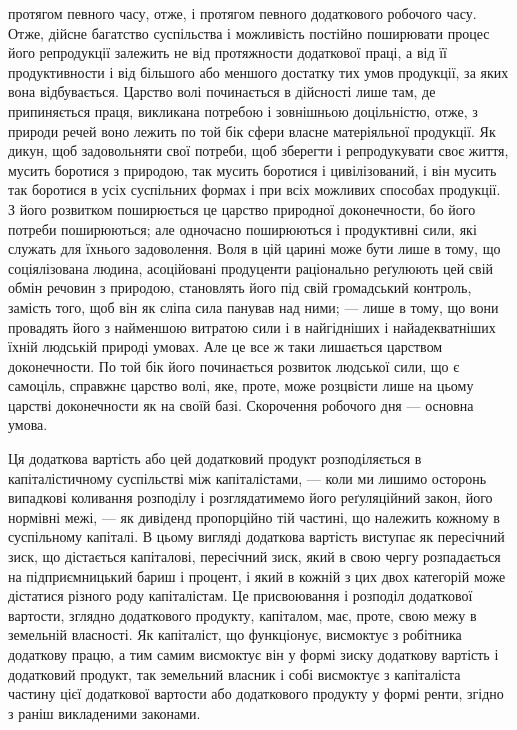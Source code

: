 \parcont{}  %
протягом певного часу, отже, і протягом певного додаткового робочого часу. Отже,
дійсне багатство суспільства і можливість постійно поширювати процес його
репродукції залежить не від протяжности додаткової праці, а від її продуктивности
і від більшого або меншого достатку тих умов продукції, за яких вона відбувається.
Царство волі починається в дійсності лише там, де припиняється праця,
викликана потребою і зовнішньою доцільністю, отже, з природи речей воно
лежить по той бік сфери власне матеріяльної продукції. Як дикун, щоб задовольняти
свої потреби, щоб зберегти і репродукувати своє життя, мусить боротися
з природою, так мусить боротися і цивілізований, і він мусить так боротися
в усіх суспільних формах і при всіх можливих способах продукції. З його
розвитком поширюється це царство природної доконечности, бо його потреби
поширюються; але одночасно поширюються і продуктивні сили, які служать
для їхнього задоволення. Воля в цій царині може бути лише в тому, що соціялізована
людина, асоційовані продуценти раціонально реґулюють цей свій обмін
речовин з природою, становлять його під свій громадський контроль, замість того,
щоб він як сліпа сила панував над ними; — лише в тому, що вони провадять його
з найменшою витратою сили і в найгідніших і найадекватніших їхній людській
природі умовах. Але це все ж таки лишається царством доконечности. По той
бік його починається розвиток людської сили, що є самоціль, справжнє царство
волі, яке, проте, може розцвісти лише на цьому царстві доконечности як на
своїй базі. Скорочення робочого дня — основна умова.

Ця додаткова вартість або цей додатковий продукт розподіляється в капіталістичному
суспільстві між капіталістами, — коли ми лишимо осторонь випадкові
коливання розподілу і розглядатимемо його реґуляційний закон, його нормівні
межі, — як дивіденд пропорційно тій частині, що належить кожному в суспільному
капіталі. В цьому вигляді додаткова вартість виступає як пересічний
зиск, що дістається капіталові, пересічний зиск, який в свою чергу розпадається
на підприємницький бариш і процент, і який в кожній з цих двох категорій
може дістатися різного роду капіталістам. Це присвоювання і розподіл додаткової
вартости, зглядно додаткового продукту, капіталом, має, проте, свою межу в земельній
власності. Як капіталіст, що функціонує, висмоктує з робітника додаткову
працю, а тим самим висмоктує він у формі зиску додаткову вартість
і додатковий продукт, так земельний власник і собі висмоктує з капіталіста
частину цієї додаткової вартости або додаткового продукту у формі ренти, згідно
з раніш викладеними законами.

